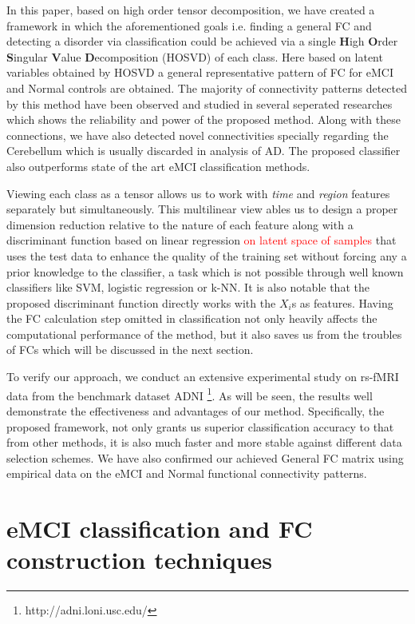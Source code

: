 \documentclass[preprint,12pt]{elsarticle}
\begin{document}
						
	In this paper, based on high order tensor decomposition, we have created a framework in which the aforementioned goals i.e. finding a general FC and detecting a disorder via classification could be achieved via a single \textbf{H}igh \textbf{O}rder \textbf{S}ingular \textbf{V}alue \textbf{D}ecomposition (HOSVD) of each class.
	 Here based on latent variables obtained by HOSVD a general representative pattern of FC for eMCI and Normal controls are obtained. 
	 The majority of connectivity patterns detected by this method have been observed and studied in several seperated researches which shows the reliability and power of the proposed method. Along with these connections, we have also detected novel connectivities specially regarding the Cerebellum which is usually discarded in analysis of AD.     
	 The proposed classifier also outperforms state of the art eMCI classification methods. 
	 
	 Viewing each class as a tensor allows us to work with \textit{time} and \textit{region} features separately but simultaneously. This multilinear view
	  ables us to design a proper dimension reduction relative to the nature of each feature along with a discriminant function based on linear regression \textcolor{red}{on latent space of samples} that uses the test data to enhance the quality of the training set without forcing any a prior knowledge to the classifier, a task which is not possible through well known classifiers like SVM, logistic regression or k-NN. It is also notable that the proposed discriminant function directly works with the $X_i$s as features. Having the FC calculation step omitted in classification not only heavily affects the computational performance of the method, but it also saves us from the troubles of FCs which will be discussed in the next section.   
	  
	  To verify our approach, we conduct an extensive experimental study on rs-fMRI data from the
	  	benchmark dataset ADNI
	  	\footnote{http://adni.loni.usc.edu/}.
	  	As will be seen, the results well demonstrate the effectiveness and advantages of our method. Specifically, the proposed framework, not only grants us superior classification accuracy to that from other methods, it is also much faster and more stable against different data selection schemes. We have also confirmed our achieved General FC matrix using empirical data on the eMCI and Normal functional connectivity patterns.
	  	
							 
	\section{eMCI classification and FC construction techniques}
\end{document}
